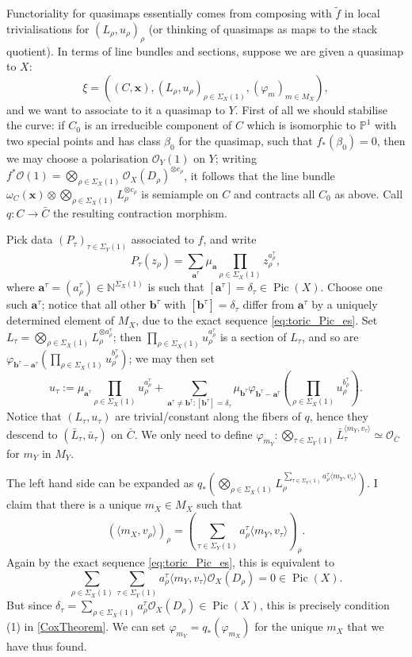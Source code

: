 \documentclass[11pt]{amsart}
\newcommand{\PP}{\mathbb P}
\newcommand{\N}{\mathbb{N}}
\newcommand{\OO}{\mathcal{O}}
\renewcommand{\to}{\rightarrow}
\newcommand{\Pic}{\operatorname{Pic}}
\theoremstyle{definition}
\theoremstyle{definition}
\begin{document}
Functoriality for quasimaps essentially comes from composing with $\tilde{f}$ in local trivialisations for $(L_\rho,u_\rho)_\rho$ (or thinking of quasimaps as maps to the stack quotient). In terms of line bundles and sections, suppose we are given a quasimap to $X$: \[\xi=\left( (C,\mathbf x),(L_\rho,u_\rho)_{\rho\in\Sigma_X(1)},(\varphi_m)_{m\in M_X}\right),\]
and we want to associate to it a quasimap to $Y$. First of all we should stabilise the curve: if $C_0$ is an irreducible component of $C$ which is isomorphic to $\PP^1$ with two special points and has class $\beta_0$ for the quasimap, such that $f_*(\beta_0)=0$, then we may choose a polarisation $\OO_Y(1)$ on $Y$; writing $f^*\OO(1)=\bigotimes_{\rho\in\Sigma_X(1)}\OO_X(D_\rho)^{\otimes c_\rho}$, it follows that the line bundle $\omega_C(\mathbf x)\otimes \bigotimes_{\rho\in\Sigma_X(1)}L_\rho^{\otimes c_\rho}$ is semiample on $C$ and contracts all $C_0$ as above. Call $q\colon C\to \bar C$ the resulting contraction morphism.

Pick data $(P_\tau)_{\tau\in\Sigma_Y(1)}$ associated to $f$, and write \[P_\tau(z_\rho)=\sum_{\mathbf a^\tau}\mu_{\mathbf a}\prod_{\rho\in\Sigma_X(1)}z_\rho^{a^\tau_\rho},\] where $\mathbf a^\tau=(a^\tau_\rho)\in\N^{\Sigma_X(1)}$ is such that $[\mathbf a^\tau]=\delta_\tau\in\Pic(X)$. Choose one such $\mathbf a^\tau$; notice that all other $\mathbf b^\tau$ with $[\mathbf b^\tau]=\delta_\tau$ differ from $\mathbf a^\tau$ by a uniquely determined element of $M_X$, due to the exact sequence \eqref{eq:toric_Pic_es}. Set $L_\tau=\bigotimes_{\rho\in\Sigma_X(1)}L_\rho^{\otimes a^\tau_\rho}$; then $\prod_{\rho\in\Sigma_X(1)}u_\rho^{a^\tau_\rho}$ is a section of $L_\tau$, and so are $\varphi_{\mathbf b^\tau-\mathbf a^\tau}(\prod_{\rho\in\Sigma_X(1)}u_\rho^{b^\tau_\rho})$; we may then set 
\[u_\tau:=\mu_{\mathbf a^\tau}\prod_{\rho\in\Sigma_X(1)}u_\rho^{a^\tau_\rho}+\sum_{\mathbf a^\tau\neq \mathbf b^\tau:[\mathbf b^\tau]=\delta_\tau}\mu_{\mathbf b^\tau}\varphi_{\mathbf b^\tau-\mathbf a^\tau}\left(\prod_{\rho\in\Sigma_X(1)}u_\rho^{b^\tau_\rho}\right).\]
Notice that $(L_\tau,u_\tau)$ are trivial/constant along the fibers of $q$, hence they descend to $(\bar L_\tau,\bar u_\tau)$ on $\bar C$. We only need to define $\varphi_{m_Y}\colon \bigotimes_{\tau\in\Sigma_Y(1)}\bar L_\tau^{\langle m_Y,v_\tau\rangle}\simeq \OO_{\bar C}$ for $m_Y$ in $M_Y$.

The left hand side can be expanded as $q_*\left(\bigotimes_{\rho\in\Sigma_X(1)}L_\rho^{\sum_{\tau\in\Sigma_Y(1)}a^\tau_\rho \langle m_Y,v_\tau\rangle} \right)$. I claim that there is a unique $m_X\in M_X$ such that \[(\langle m_X,v_\rho\rangle)_\rho= (\sum_{\tau\in\Sigma_Y(1)}a^\tau_\rho \langle m_Y,v_\tau\rangle)_\rho.\] Again by the exact sequence \eqref{eq:toric_Pic_es}, this is equivalent to \[\sum_{\rho\in\Sigma_X(1)}\sum_{\tau\in\Sigma_Y(1)}a^\tau_\rho \langle m_Y,v_\tau\rangle\OO_X(D_\rho)=0\in\Pic(X).\] But since $\delta_\tau=\sum_{\rho\in\Sigma_X(1)}a^\tau_\rho\OO_X(D_\rho)\in \Pic(X)$, this is precisely condition (1) in \ref{CoxTheorem}. We can set $\varphi_{m_Y}=q_*(\varphi_{m_X})$ for the unique $m_X$ that we have thus found.
\end{document}
